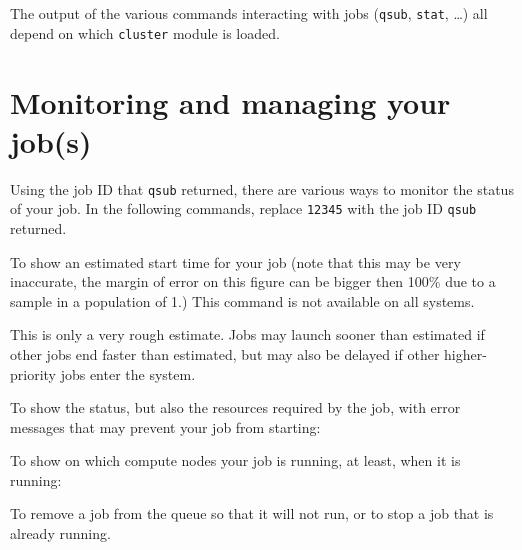 The output of the various commands interacting with jobs (\lstinline|qsub|, \lstinline|stat|, \ldots)
all depend on which \lstinline|cluster| module is loaded.
\fi


\section{Monitoring and managing your job(s)}
\label{sec:monitoring-and-managing-your-jobs}

Using the job ID that \lstinline|qsub| returned, there are various ways to monitor
the status of your job. In the following commands, replace \lstinline|12345|
with the job ID \lstinline|qsub| returned.



\begin{prompt}
\end{prompt}

\ifgent
\else
\ifbrussel
\else
  To show an estimated start time for your job (note that this may be very inaccurate,
  the margin of error on this figure can be bigger then 100\% due to a sample in a
  population of 1.)
  This command is not available on all systems.

\begin{prompt}
\end{prompt}

  This is only a very rough estimate. Jobs may launch sooner than estimated if
  other jobs end faster than estimated, but may also be delayed if other
  higher-priority jobs enter the system.

  To show the status, but also the resources required by the job, with error
  messages that may prevent your job from starting:

\begin{prompt}
\end{prompt}
\fi
\fi

To show on which compute nodes your job is running, at least, when it is
running:

\begin{prompt}
\end{prompt}

To remove a job from the queue so that it will not run, or to stop a job that
is already running.

\begin{prompt}
\end{prompt}

